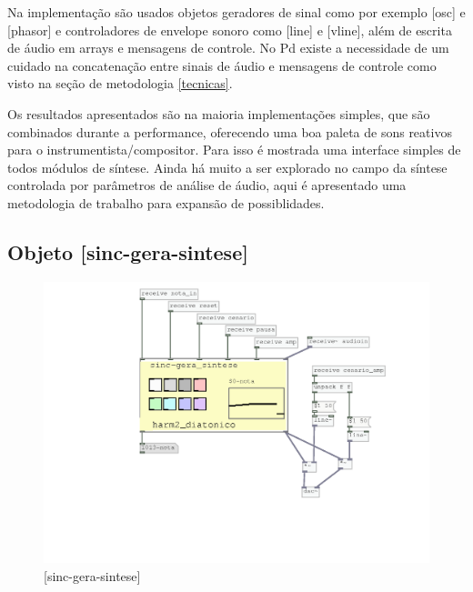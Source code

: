 \documentclass{ppgmus}
\begin{document}
Na implementação são usados objetos geradores de sinal como
por exemplo [osc\texttildelow] e [phasor\texttildelow] e
controladores de envelope sonoro como [line\texttildelow] e
[vline\texttildelow], além de escrita de áudio em arrays e 
mensagens de controle.
No Pd existe a necessidade de um cuidado na concatenação entre
sinais de áudio e mensagens de controle como visto na seção de metodologia \ref{tecnicas}.




Os resultados apresentados são na maioria implementações simples,
que são combinados durante a performance, oferecendo uma boa paleta
de sons reativos para o instrumentista/compositor. Para isso é
mostrada uma interface simples de todos módulos de síntese.
Ainda há muito a ser explorado no campo da síntese controlada
por parâmetros de análise de áudio, aqui é apresentado uma
metodologia de trabalho para expansão de possiblidades.











% 
% 



\subsection{ Objeto [sinc-gera-sintese]}


\begin{figure}
\includegraphics[scale=.6]{sinc-gera-sintese}
\caption{[sinc-gera-sintese]}
\label{sincgerasintese}
\end{figure}
\end{document}
